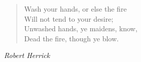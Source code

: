 
\begin{verse}
Wash your hands, or else the fire\\
Will not tend to your desire;\\
Unwashed hands, ye maidens, know,\\
Dead the fire, though ye blow.%
\end{verse}

\vspace{0.5\baselineskip}
\noindent\textit{Robert Herrick}

\newpage
